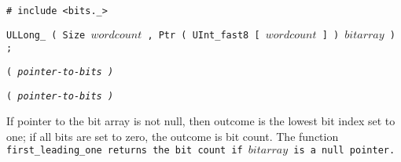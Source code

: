 
\tt{# include <bits._>}

\tt{ULLong_} \s\s\tt{( Size} $wordcount$
\tt{, Ptr ( UInt_fast8 [} $wordcount$ \tt{] )} $bitarray$ \tt{) ;}

\s\s
\tt{(} \it{pointer-to-bits} \tt{)}

\s\s\s
\tt{(} \it{pointer-to-bits} \tt{)}


If pointer to the bit array is not null, then outcome is the lowest bit
index set to one; if all bits are set to zero, the outcome is bit count.
The function \tt{first_leading_one} returns
the bit count if $bitarray$ is a null pointer.
